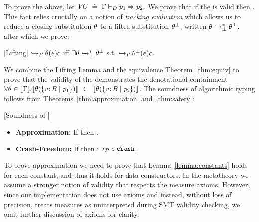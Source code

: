 To prove the above, let ${\mathit{VC} \ \doteq\  \Gamma \vdash_{D} p_1 \Rightarrow p_2}$. 
We prove that if the \VC is valid then 
.
%
This fact relies crucially on a notion of \emph{tracking evaluation} 
which allows us to reduce a closing substitution $\theta$ to a lifted substitution 
$\theta^\perp$, written $\theta \hookrightarrow_{\perp}^{*} \theta^\perp$, after which we prove:

\begin{lemma}{[Lifting]} 
$\hookrightarrow_P {\theta(e)}{c}$ iff $\exists \theta \hookrightarrow_{\perp}^{*} \theta^\perp$ s.t. $\hookrightarrow_P {\theta^\perp(e)}{c}$.
\end{lemma}

We combine the Lifting Lemma and the equivalence Theorem~\ref{thm:equiv} 
to prove that the validity of the \VC demonstrates 
the denotational containment
$\forall \theta\in [\![\Gamma]\!]. 
  		 [\![\theta(\{ {\mathit{v}\!:\!\mathit{B}} \mid \mathit{p}_1 \})]\!] 
  		$ $\subseteq$ $[\![\theta(\{ {\mathit{v}\!:\!\mathit{B}} \mid \mathit{p}_2 \})]\!]$.
%
The soundness of algorithmic typing follows from
Theorems~\ref{thm:approximation} and~\ref{thm:safety}:

\begin{theorem} {[Soundness of \declang]} 
\begin{itemize}
\item\textbf{Approximation:} If  then
  .
\item\textbf{Crash-Freedom:} If  
        then $\hookrightarrow_P {e\not}{\mathtt{crash}}$.
\end{itemize}
\end{theorem}

To prove approximation we need to prove that Lemma~\ref{lemma:constants} holds for
each constant, and thus it holds for data 
constructors.
In the metatheory we assume a stronger notion 
of validity that respects the measure axioms. 
%
However, since our implementation does not use axioms and instead, 
without loss of precision, treats measures as uninterpreted 
during SMT validity checking, we omit further discussion of axioms 
for clarity.



